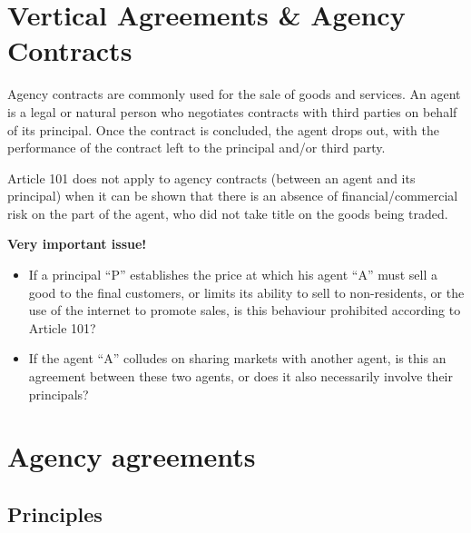 \section{Vertical Agreements \& Agency Contracts}

        Agency contracts are commonly used for the sale of goods and services. An agent is a legal or natural person who negotiates contracts with third parties on behalf of its principal. Once the contract is concluded, the agent drops out, with the performance of the contract left to the principal and/or third party.

        Article 101 does not apply to agency contracts (between an agent and its principal) when it can be shown that there is an absence of financial/commercial risk on the part of the agent, who did not take title on the goods being traded.
        
        \textbf{Very important issue!}
        \begin{itemize}
            \item If a principal ``P'' establishes the price at which his agent ``A'' must sell a good to the final customers, or limits its ability to sell to non-residents, or the use of the internet to promote sales, is this behaviour prohibited according to Article 101?
            \item If the agent ``A'' colludes on sharing markets with another agent, is this an agreement between these two agents, or does it also necessarily involve their principals?
        \end{itemize} 

\section{Agency agreements}

    \subsection{Principles}

